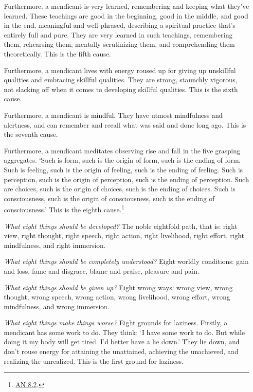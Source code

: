 \documentclass[12pt,openany]{book}%
\begin{document}
Furthermore, a mendicant is very learned, remembering and keeping what they’ve learned. These teachings are good in the beginning, good in the middle, and good in the end, meaningful and well-phrased, describing a spiritual practice that’s entirely full and pure. They are very learned in such teachings, remembering them, rehearsing them, mentally scrutinizing them, and comprehending them theoretically. This is the fifth cause. 

Furthermore, a mendicant lives with energy roused up for giving up unskillful qualities and embracing skillful qualities. They are strong, staunchly vigorous, not slacking off when it comes to developing skillful qualities. This is the sixth cause. 

Furthermore, a mendicant is mindful. They have utmost mindfulness and alertness, and can remember and recall what was said and done long ago. This is the seventh cause. 

Furthermore, a mendicant meditates observing rise and fall in the five grasping aggregates. ‘Such is form, such is the origin of form, such is the ending of form. Such is feeling, such is the origin of feeling, such is the ending of feeling. Such is perception, such is the origin of perception, such is the ending of perception. Such are choices, such is the origin of choices, such is the ending of choices. Such is consciousness, such is the origin of consciousness, such is the ending of consciousness.’ This is the eighth cause.\footnote{\href{https://suttacentral.net/an8.2/en/sujato}{AN 8.2}. } 

\emph{What eight things should be developed?} The noble eightfold path, that is: right view, right thought, right speech, right action, right livelihood, right effort, right mindfulness, and right immersion. 

\emph{What eight things should be completely understood?} Eight worldly conditions: gain and loss, fame and disgrace, blame and praise, pleasure and pain. 

\emph{What eight things should be given up?} Eight wrong ways: wrong view, wrong thought, wrong speech, wrong action, wrong livelihood, wrong effort, wrong mindfulness, and wrong immersion. 

\emph{What eight things make things worse?} Eight grounds for laziness. Firstly, a mendicant has some work to do. They think: ‘I have some work to do. But while doing it my body will get tired. I’d better have a lie down.’ They lie down, and don’t rouse energy for attaining the unattained, achieving the unachieved, and realizing the unrealized. This is the first ground for laziness. 
\end{document}
